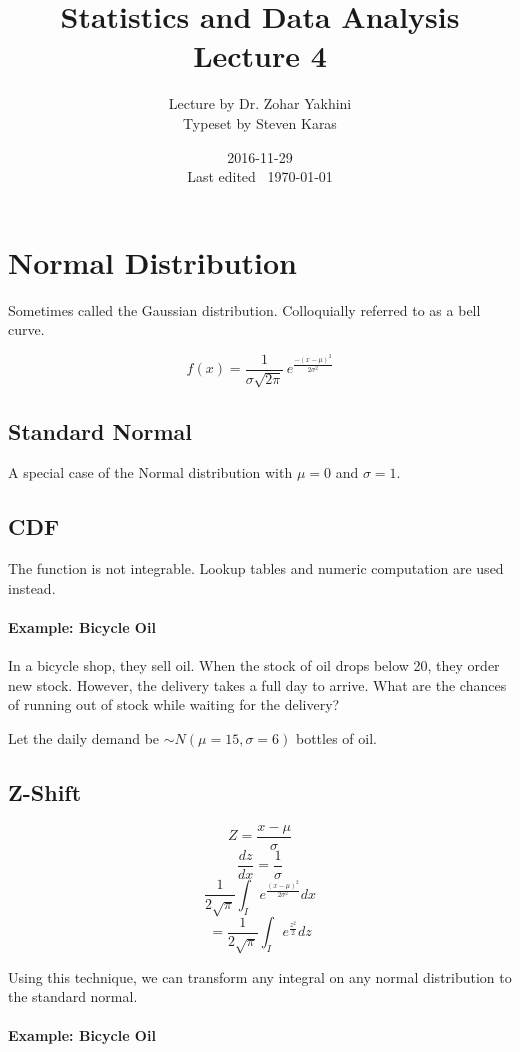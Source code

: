 \documentclass[a4paper]{article}
\title{Statistics and Data Analysis\\\large Lecture 4}
\date{2016-11-29 \\ Last edited \currenttime\ \today}
\author{Lecture by Dr. Zohar Yakhini\\Typeset by Steven Karas}
\begin{document}
\maketitle

\section{Normal Distribution}
Sometimes called the Gaussian distribution. Colloquially referred to as a bell curve.

\[f(x)=\frac{1}{\sigma\sqrt{2\pi}}\, e^{\frac{-(x-\mu)^2}{2\sigma^2}}\]

\subsection{Standard Normal}
A special case of the Normal distribution with $\mu=0$ and $\sigma=1$.

\subsection{CDF}
The function is not integrable. Lookup tables and numeric computation are used instead.

\paragraph{Example: Bicycle Oil}
In a bicycle shop, they sell oil. When the stock of oil drops below 20, they order new stock. However, the delivery takes a full day to arrive. What are the chances of running out of stock while waiting for the delivery?

Let the daily demand be $\sim N(\mu=15, \sigma=6)$ bottles of oil.

\subsection{Z-Shift}

\[Z=\frac{x-\mu}{\sigma}\]
\[\frac{dz}{dx}=\frac{1}{\sigma}\]
\[\frac{1}{2\sqrt{\pi}} \int_I e^{\frac{(x-\mu)^2}{2\sigma^2}} dx\]
\[=\frac{1}{2\sqrt{\pi}} \int_I e^{\frac{z^2}{2}} dz\]

Using this technique, we can transform any integral on any normal distribution to the standard normal.

\paragraph{Example: Bicycle Oil}
\end{document}

